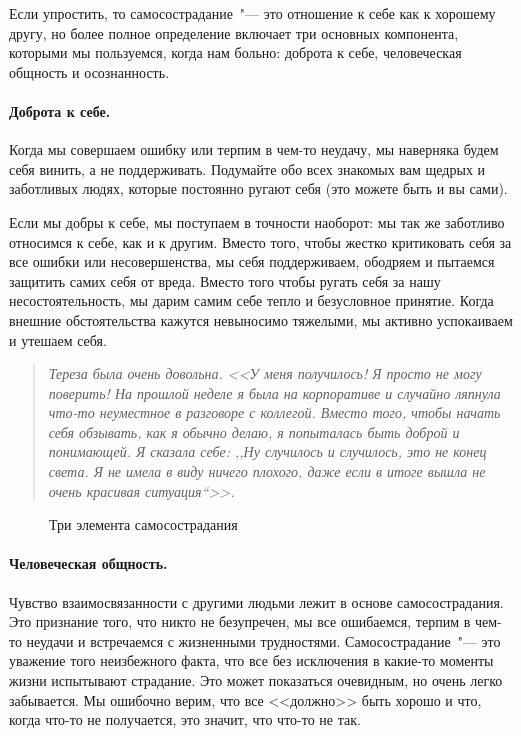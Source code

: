 Если упростить, то самосострадание~"--- это отношение к себе как к хорошему другу, но более полное определение включает три основных компонента, которыми мы пользуемся, когда нам больно: доброта к себе, человеческая общность и осознанность.

\paragraph{Доброта к себе.} 
Когда мы совершаем ошибку или терпим в чем-то неудачу, мы наверняка будем себя винить, а не поддерживать. Подумайте обо всех знакомых вам щедрых и заботливых людях, которые постоянно ругают себя (это можете быть и вы сами). 

Если мы добры к себе, мы поступаем в точности наоборот: мы так же заботливо относимся к себе, как и к другим. Вместо того, чтобы жестко критиковать себя за все ошибки или несовершенства, мы себя поддерживаем, ободряем и пытаемся защитить самих себя от вреда. Вместо того чтобы ругать себя за нашу несостоятельность, мы дарим самим себе тепло и безусловное принятие. Когда внешние обстоятельства кажутся невыносимо тяжелыми, мы активно успокаиваем и утешаем себя. 

\begin{quote}
	\textit{Тереза была очень довольна. <<У меня получилось! Я просто не могу поверить! На прошлой неделе я была на корпоративе и случайно ляпнула  что-то неуместное в разговоре с коллегой. Вместо того, чтобы начать себя обзывать, как я обычно делаю, я попыталась быть доброй и понимающей. Я сказала себе: ,,Ну случилось и случилось, это не конец света. Я не имела в виду ничего плохого, даже если в итоге вышла не очень красивая ситуация``>>.}
\end{quote}

\begin{figure}[h]
	\begin{center}
		
		\caption{Три элемента самосострадания}
	\end{center}
\end{figure}

\paragraph{Человеческая общность.}
 Чувство взаимосвязанности с другими людьми лежит в основе самосострадания. Это признание того, что никто не безупречен, мы все ошибаемся, терпим в чем-то неудачи и встречаемся с жизненными трудностями. Самосострадание~"--- это уважение того неизбежного факта, что все без исключения в какие-то моменты жизни испытывают страдание. Это может показаться очевидным, но очень легко забывается. Мы ошибочно верим, что все <<должно>> быть хорошо и что, когда что-то не получается, это значит, что что-то не так. 

